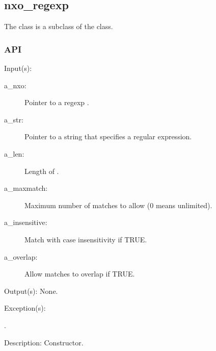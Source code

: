 %
%
%
%
%              

\subsection{nxo\_regexp}
\label{nxo_regexp}

The  class is a subclass of the  class.

\subsubsection{API}
\begin{capi}
\label{nxo_regexp_new}
	\begin{capilist}
	\item[Input(s): ]
		\begin{description}\item[]
		\item[a\_nxo: ]
			Pointer to a regexp .
		\item[a\_str: ]
			Pointer to a string that specifies a regular expression.
		\item[a\_len: ]
			Length of .
		\item[a\_maxmatch: ]
			Maximum number of matches to allow (0 means unlimited).
		\item[a\_insensitive: ]
			Match with case insensitivity if TRUE.
		\item[a\_overlap: ]
			Allow matches to overlap if TRUE.
		\end{description}
	\item[Output(s): ] None.
	\item[Exception(s): ]
		\begin{description}\item[]
		\item[.]
		\end{description}
	\item[Description: ]
		Constructor.
	\end{capilist}
\end{capi}
